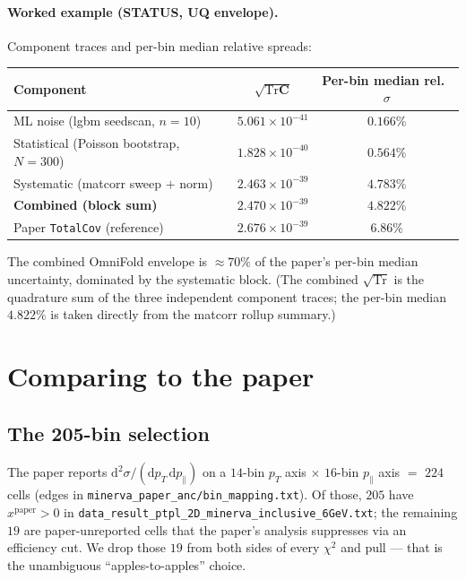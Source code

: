 \documentclass[12pt]{article}
\newcommand{\pT}{p_{T}}
\newcommand{\pPar}{p_{\parallel}}
\newcommand{\paper}{\text{paper}}
\newcommand{\Tr}{\mathrm{Tr}}
\begin{document}
\paragraph{Worked example (STATUS, UQ envelope).}
Component traces and per-bin median relative spreads:
\begin{center}
\begin{tabular}{@{}lcc@{}}
\toprule
Component & $\sqrt{\Tr\mathbf{C}}$ & Per-bin median rel.\ $\sigma$ \\
\midrule
ML noise (lgbm seedscan, $n=10$) & $5.061\times10^{-41}$ & $0.166\%$ \\
Statistical (Poisson bootstrap, $N=300$) & $1.828\times10^{-40}$ & $0.564\%$ \\
Systematic (matcorr sweep $+$ norm) & $2.463\times10^{-39}$ & $4.783\%$ \\
\midrule
\textbf{Combined (block sum)} & $2.470\times10^{-39}$ & $\boxed{4.822\%}$ \\
Paper \texttt{TotalCov} (reference) & $2.676\times10^{-39}$ & $6.86\%$ \\
\bottomrule
\end{tabular}
\end{center}
The combined OmniFold envelope is $\approx 70\%$ of the paper's per-bin
median uncertainty, dominated by the systematic block. (The combined
$\sqrt{\Tr}$ is the quadrature sum of the three independent component
traces; the per-bin median $4.822\%$ is taken directly from the
matcorr rollup summary.)

\section{Comparing to the paper}
\label{sec:compare}

\subsection{The 205-bin selection}
\label{sec:205bins}

The paper reports $\mathrm{d}^{2}\sigma/(\mathrm{d}\pT\,\mathrm{d}\pPar)$
on a $14$-bin $\pT$ axis $\times$ $16$-bin $\pPar$ axis $=$ $224$
cells (edges in
\texttt{minerva\_paper\_anc/bin\_mapping.txt}). Of those, $205$ have
$x^{\paper}>0$ in
\texttt{data\_result\_ptpl\_2D\_minerva\_inclusive\_6GeV.txt}; the
remaining $19$ are paper-unreported cells that the paper's analysis
suppresses via an efficiency cut. We drop those $19$ from both sides
of every $\chi^{2}$ and pull --- that is the unambiguous
``apples-to-apples'' choice.
\end{document}
